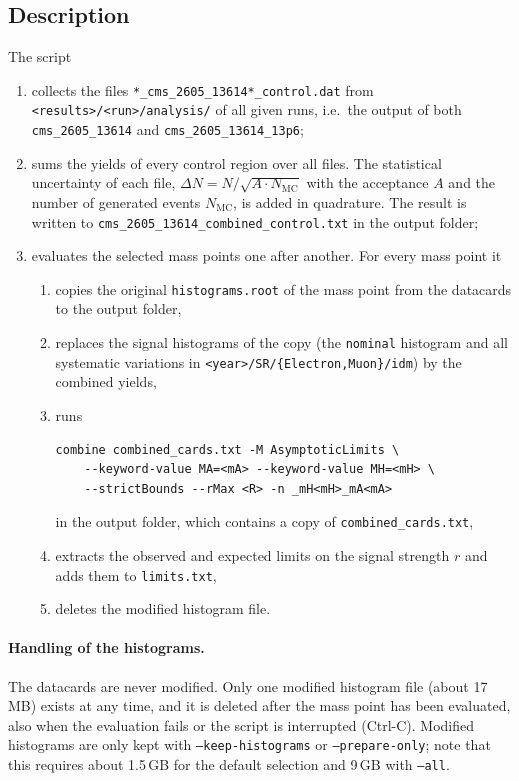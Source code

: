 \documentclass[11pt,a4paper]{article}
\newcommand{\file}[1]{\texttt{#1}}
\newcommand{\opt}[1]{\texttt{#1}}
\begin{document}
\subsection{Description}

The script
\begin{enumerate}
  \item collects the files \file{*\_cms\_2605\_13614*\_control.dat} from
        \file{<results>/<run>/analysis/} of all given runs, i.e.\ the output
        of both \file{cms\_2605\_13614} and \file{cms\_2605\_13614\_13p6};
  \item sums the yields of every control region over all files. The
        statistical uncertainty of each file,
        $\Delta N = N / \sqrt{A \cdot N_\mathrm{MC}}$ with the acceptance $A$
        and the number of generated events $N_\mathrm{MC}$, is added in
        quadrature. The result is written to
        \file{cms\_2605\_13614\_combined\_control.txt} in the output folder;
  \item evaluates the selected mass points one after another. For every
        mass point it
        \begin{enumerate}
          \item copies the original \file{histograms.root} of the mass point
                from the datacards to the output folder,
          \item replaces the signal histograms of the copy (the
                \texttt{nominal} histogram and all systematic variations in
                \file{<year>/SR/\{Electron,Muon\}/idm}) by the combined yields,
          \item runs
\begin{lstlisting}
combine combined_cards.txt -M AsymptoticLimits \
    --keyword-value MA=<mA> --keyword-value MH=<mH> \
    --strictBounds --rMax <R> -n _mH<mH>_mA<mA>
\end{lstlisting}
                in the output folder, which contains a copy of
                \file{combined\_cards.txt},
          \item extracts the observed and expected limits on the signal
                strength $r$ and adds them to \file{limits.txt},
          \item deletes the modified histogram file.
        \end{enumerate}
\end{enumerate}

\paragraph{Handling of the histograms.} The datacards are never modified.
Only one modified histogram file (about 17\,MB) exists at any time, and it
is deleted after the mass point has been evaluated, also when the evaluation
fails or the script is interrupted (Ctrl-C). Modified histograms are only
kept with \opt{--keep-histograms} or \opt{--prepare-only}; note that this
requires about 1.5\,GB for the default selection and 9\,GB with
\opt{--all}.
\end{document}
